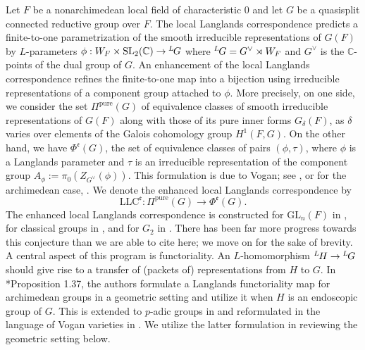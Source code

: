 \documentclass[11pt,letterpaper]{amsart}
\newcommand{\BC}{\mathbb{C}}
\newcommand{\SL}{\mathrm{SL}}
\newcommand{\GL}{\mathrm{GL}}
\newcommand{\dualgroup}[1]{{#1}^\vee}
\newcommand{\Lgroup}[1]{{\hskip-2 pt \,^L\hskip-1pt{#1}}}
\newcommand{\pure}{\mathrm{pure}}
\newcommand{\mfr}[1]{\mathfrak{#1}}
\newcommand{\LLC}{\mathrm{LLC}}
\newcommand{\CC}{\mathbb{C}}
\renewcommand{\1}{\mathbbm{1}}
\numberwithin{equation}{section}
\begin{document}
Let $F$ be a nonarchimedean local field of characteristic $0$ and let $G$ be a quasisplit connected reductive group over $F$.  The local Langlands correspondence predicts a finite-to-one parametrization of the smooth irreducible representations of $G(F)$ by $L$-parameters $\phi: W_F\times\SL_2(\BC)\to\Lgroup{G}$ where $\Lgroup{G}=\dualgroup{G}\rtimes W_F$ and $\dualgroup{G}$ is the $\CC$-points of the dual group of $G$.  An enhancement of the local Langlands correspondence refines the finite-to-one map into a bijection using irreducible representations of a component group attached to $\phi$. More precisely, on one side, we consider the set $\Pi^{\pure}(G)$ of equivalence classes of smooth irreducible representations of $G(F)$ along with those of its pure inner forms $G_\delta(F)$, as $\delta$ varies over elements of the Galois cohomology group $H^1(F,G)$. On the other hand, we have $\Phi^{\mfr{e}}(G)$, the set of equivalence classes of pairs $(\phi,\tau)$, where $\phi$ is a Langlands parameter and $\tau$ is an irreducible representation of the component group $A_\phi:=\pi_0(Z_{\dualgroup{G}}(\phi))$. This formulation is due to Vogan; see \cite{Vog93}, or for the archimedean case, \cite{ABV92}. We denote the enhanced local Langlands correspondence by
\[ \LLC^{\mfr{e}}: \Pi^{\pure}(G) \to \Phi^{\mfr{e}}(G).\]
The enhanced local Langlands correspondence is constructed for $\GL_n(F)$ in \cites{HT01, Hen00, scholze}, for classical groups in \cites{Art13, mokendoscopic2015, KMSW14, MR18, Ish24}, and for $G_2$ in \cites{GanSavin2023, aubert2023explicitlocallanglandscorrespondence}. There has been far more progress towards this conjecture than we are able to cite here; we move on for the sake of brevity.
A central aspect of this program is functoriality. An $L$-homomorphism $\Lgroup{H}\to\Lgroup{G}$ should give rise to a transfer of (packets of) representations from $H$ to $G$.  In \cite{ABV92}*{Proposition 1.37}, the authors formulate a Langlands functoriality map for archimedean groups in a geometric setting and utilize it when $H$ is an endoscopic group of $G$. This is extended to $p$-adic groups in \cite{Vog93} and reformulated in the language of Vogan varieties in \cite{CFMMX22}. We utilize the latter formulation in reviewing the geometric setting below. 
\end{document}
